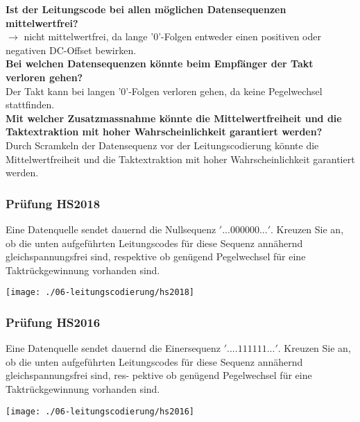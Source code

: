 \textbf{Ist der Leitungscode bei allen möglichen Datensequenzen mittelwertfrei?}\\
$\rightarrow$ nicht mittelwertfrei, da lange '0'-Folgen entweder einen positiven oder negativen DC-Offset bewirken.\\

\textbf{Bei welchen Datensequenzen könnte beim Empfänger der Takt verloren gehen?}\\
Der Takt kann bei langen '0'-Folgen verloren gehen, da keine Pegelwechsel stattfinden.\\

\textbf{Mit welcher Zusatzmassnahme könnte die Mittelwertfreiheit und die Taktextraktion mit hoher Wahrscheinlichkeit garantiert werden?}\\
Durch Scramkeln der Datensequenz vor der Leitungscodierung könnte die Mittelwertfreiheit und die Taktextraktion mit hoher Wahrscheinlichkeit garantiert werden.

\subsubsection{Prüfung HS2018}
Eine Datenquelle sendet dauernd die Nullsequenz $'... 0 0 0 0 0 0 ...'$. Kreuzen Sie an, ob die unten aufgeführten Leitungscodes für diese Sequenz annähernd gleichspannungsfrei sind, respektive ob genügend Pegelwechsel für eine Taktrückgewinnung vorhanden sind.
\begin{center}
    \vspace{-8pt}
    \texttt{[image: ./06-leitungscodierung/hs2018]}
    \vspace{-8pt}
\end{center}

\subsubsection{Prüfung HS2016}
Eine Datenquelle sendet dauernd die Einersequenz $'....1 1 1 1 1 1 ...'$. Kreuzen Sie an, ob die unten aufgeführten Leitungscodes für diese Sequenz annähernd gleichspannungsfrei sind, res-
pektive ob genügend Pegelwechsel für eine Taktrückgewinnung vorhanden sind.
\begin{center}
    \vspace{-8pt}
    \texttt{[image: ./06-leitungscodierung/hs2016]}
    \vspace{-8pt}
\end{center}
